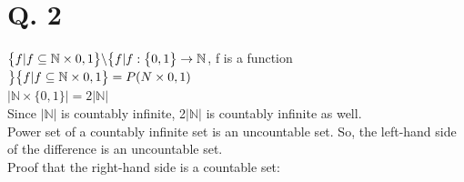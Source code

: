\documentclass[10pt]{article}
\begin{document}
\section*{Q. 2}
$\big\{f|f\subseteq\mathbb{N}\times{0,1}\big\}\symbol{92} \big\{f|f:\big\{0,1\big\}\rightarrow\mathbb{N}$, f is a function$\big\}\\\\
\big\{f|f\subseteq\mathbb{N}\times{0,1}\big\}=P(N\times{0,1})$\\
$|\mathbb{N}\times \big\{0, 1\big\}| = 2|\mathbb{N}|$\\
Since $|\mathbb{N}|$ is countably infinite, 2$|\mathbb{N}|$ is countably infinite as well.\\
Power set of a countably infinite set is an uncountable set.
So, the left-hand side of the difference is an uncountable set.\\
Proof that the right-hand side is a countable set:\\
\end{document}
